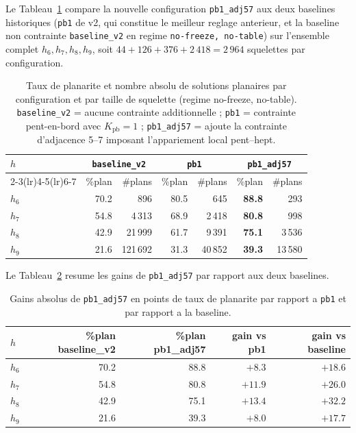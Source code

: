 \documentclass[11pt,a4paper]{article}
\begin{document}
Le Tableau~\ref{tab:pb1-vs-adj57} compare la nouvelle configuration
\texttt{pb1\_adj57} aux deux baselines historiques (\texttt{pb1} de v2,
qui constitue le meilleur reglage anterieur, et la baseline non
contrainte \texttt{baseline\_v2} en regime \texttt{no-freeze, no-table})
sur l'ensemble complet $h_6, h_7, h_8, h_9$, soit
$44 + 126 + 376 + 2\,418 = 2\,964$ squelettes par configuration.

\begin{table}[h]
\centering
\small
\begin{tabular}{lrrrrrr}
\toprule
$h$ & \multicolumn{2}{c}{\texttt{baseline\_v2}} & \multicolumn{2}{c}{\texttt{pb1}} & \multicolumn{2}{c}{\texttt{pb1\_adj57}} \\
\cmidrule(lr){2-3}\cmidrule(lr){4-5}\cmidrule(lr){6-7}
    & \%plan & \#plans & \%plan & \#plans & \%plan & \#plans \\
\midrule
$h_6$ & 70.2 & 896    & 80.5 & 645    & \textbf{88.8} & 293 \\
$h_7$ & 54.8 & 4\,313 & 68.9 & 2\,418 & \textbf{80.8} & 998 \\
$h_8$ & 42.9 & 21\,999 & 61.7 & 9\,391 & \textbf{75.1} & 3\,536 \\
$h_9$ & 21.6 & 121\,692 & 31.3 & 40\,852 & \textbf{39.3} & 13\,580 \\
\bottomrule
\end{tabular}
\caption{Taux de planarite et nombre absolu de solutions planaires par
configuration et par taille de squelette (regime no-freeze, no-table).
\texttt{baseline\_v2} = aucune contrainte additionnelle ; \texttt{pb1} =
contrainte pent-en-bord avec $K_{\text{pb}} = 1$ ; \texttt{pb1\_adj57}
= ajoute la contrainte d'adjacence 5--7 imposant l'appariement local
pent--hept.}
\label{tab:pb1-vs-adj57}
\end{table}

Le Tableau~\ref{tab:gains} resume les gains de \texttt{pb1\_adj57} par
rapport aux deux baselines.

\begin{table}[h]
\centering
\small
\begin{tabular}{lrrrr}
\toprule
$h$ & \%plan baseline\_v2 & \%plan pb1\_adj57 & gain vs pb1 & gain vs baseline \\
\midrule
$h_6$ & 70.2 & 88.8 & $+8.3$  & $+18.6$ \\
$h_7$ & 54.8 & 80.8 & $+11.9$ & $+26.0$ \\
$h_8$ & 42.9 & 75.1 & $+13.4$ & $+32.2$ \\
$h_9$ & 21.6 & 39.3 & $+8.0$  & $+17.7$ \\
\bottomrule
\end{tabular}
\caption{Gains absolus de \texttt{pb1\_adj57} en points de taux de
planarite par rapport a \texttt{pb1} et par rapport a la baseline.}
\label{tab:gains}
\end{table}
\end{document}
